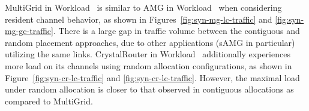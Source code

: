 
MultiGrid in Workload~ is similar to AMG in Workload~ when considering resident channel behavior, as shown in Figures~\ref{fig:syn-mg-lc-traffic} and \ref{fig:syn-mg-gc-traffic}. There is a large gap in traffic volume between the contiguous and random placement approaches, due to other applications (sAMG in particular) utilizing the same links. CrystalRouter in Workload~ additionally experiences more load on its channels using random allocation configurations, as shown in Figure~\ref{fig:syn-cr-lc-traffic} and \ref{fig:syn-cr-lc-traffic}. However, the maximal load under random allocation is closer to that observed in contiguous allocations as compared to MultiGrid.

